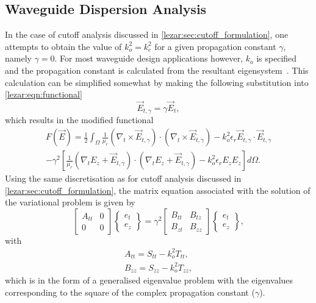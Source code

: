 \subsection{Waveguide Dispersion Analysis}
\label{lezar:sec:propagation_curves}
In the case of cutoff analysis discussed in
\ref{lezar:sec:cutoff_formulation}, one attempts to obtain the value of
$k_o^2 = k_c^2$ for a given propagation constant $\gamma$,
namely $\gamma = 0$.  For most waveguide design applications however,
$k_o$ is specified and the propagation constant is calculated
from the resultant eigensystem~\cite{Jin2002, PelCoc1998}.  This
calculation can be simplified somewhat by making the following
substitution into \eqref{lezar:eqn:functional}
\begin{equation}
    \vec{E}_{t,\gamma} = \gamma\vec{E}_t,
\end{equation}
which results in the modified functional
\begin{multline}
    \label{lezar:eqn:functional_scaled}
    F(\vec{E}) =
    \frac{1}{2}\int_{\Omega}\frac{1}{\mu_r}(\nabla_t\times{\vec{E}_{t,\gamma}})\cdot(\nabla_t\times{\vec{E}_{t,\gamma}}) -k_o^2\epsilon_r\vec{E}_{t,\gamma}\cdot{\vec{E}_{t,\gamma}}\\
    -\gamma^2\left[\frac{1}{\mu_r}(\nabla_t{E_z} +
    \vec{E}_{t,\gamma})\cdot(\nabla_t{E_z} + \vec{E}_{t,\gamma})-k_o^2\epsilon_r
    E_z{E_z}\right] d\Omega.
\end{multline}
Using the same discretisation as for cutoff analysis discussed in \ref{lezar:sec:cutoff_formulation}, the matrix equation associated with the solution of the variational problem is given by
\begin{equation}
    \label{lezar:eqn:matrix_equation_dispersion}
    \begin{bmatrix} A_{tt} & 0\\0 & 0\end{bmatrix}\begin{Bmatrix}e_t\\e_z\end{Bmatrix} =
    \gamma^2\begin{bmatrix} B_{tt} & B_{tz}\\B_{zt} &
    B_{zz}\end{bmatrix}\begin{Bmatrix}e_t\\e_z\end{Bmatrix},
\end{equation}
with
\begin{align}
    A_{tt} = S_{tt} - k_o^2 T_{tt},\\
    B_{zz} = S_{zz} - k_o^2 T_{zz},
\end{align}
which is in the form of a generalised eigenvalue
problem with the eigenvalues corresponding
to the square of the complex propagation constant ($\gamma$).

